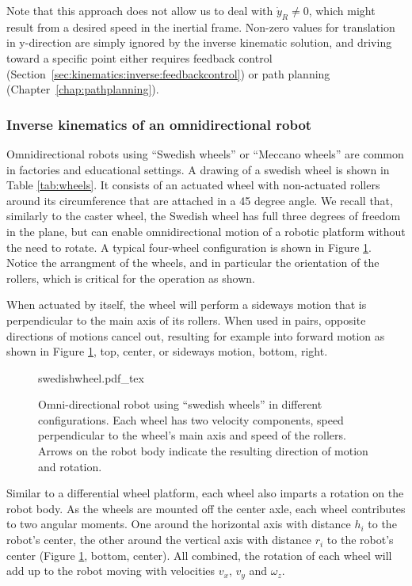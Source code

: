 Note that this approach does not allow us to deal with $\dot{y}_R \neq 0$, which might result from a desired speed in the inertial frame. Non-zero values for translation in y-direction are simply ignored by the inverse kinematic solution, and driving toward a specific point either requires feedback control (Section~\ref{sec:kinematics:inverse:feedbackcontrol}) or path planning (Chapter~\ref{chap:pathplanning}).

\subsubsection{Inverse kinematics of an omnidirectional robot}

Omnidirectional robots using ``Swedish wheels''  or ``Meccano wheels''  are common in factories and educational settings. A drawing of a swedish wheel is shown in Table \ref{tab:wheels}. It consists of an actuated wheel with non-actuated rollers around its circumference that are attached in a 45 degree angle.
%
We recall that, similarly to the caster wheel, the Swedish wheel has full three degrees of freedom in the plane, but can enable omnidirectional motion of a robotic platform without the need to rotate. A typical four-wheel configuration is shown in Figure \ref{fig:swedishwheel}. Notice the arrangment of the wheels, and in particular the orientation of the rollers, which is critical for the operation as shown.

When actuated by itself, the wheel will perform a sideways motion that is perpendicular to the main axis of its rollers. When used in pairs, opposite directions of motions cancel out, resulting for example into forward motion as shown in Figure \ref{fig:swedishwheel}, top, center, or sideways motion, bottom, right.


 \begin{figure}
    \centering
    \def\svgwidth{0.9\textwidth}
    {swedishwheel.pdf_tex}
    \caption{Omni-directional robot using ``swedish wheels'' in different configurations. Each wheel has two velocity components, speed perpendicular to the wheel's main axis and speed of the rollers. Arrows on the robot body indicate the resulting direction of motion and rotation. }
    \label{fig:swedishwheel}
\end{figure}

Similar to a differential wheel platform, each wheel also imparts a rotation on the robot body. As the wheels are mounted off the center axle, each wheel contributes to two angular moments. One around the horizontal axis with distance $h_i$ to the robot's center, the other around the vertical axis with distance $r_i$ to the robot's center (Figure \ref{fig:swedishwheel}, bottom, center). All combined, the rotation of each wheel will add up to the robot moving with velocities $v_x$, $v_y$ and $\omega_z$.

